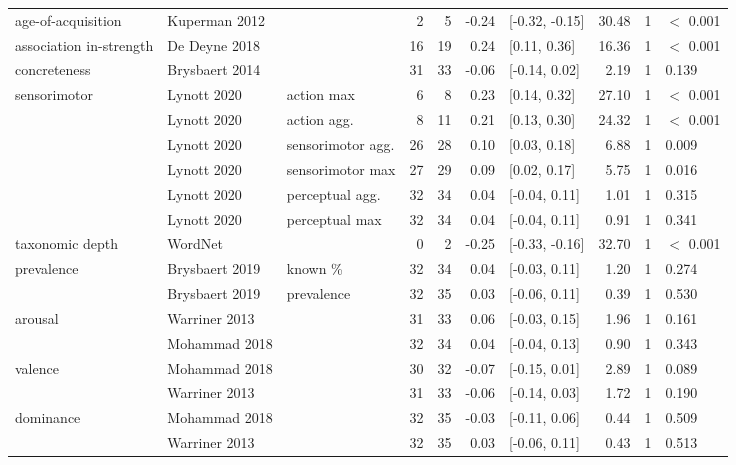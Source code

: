 \begin{table}[ht]
\begin{tabular}{lllrrrlrrl}
  age-of-acquisition & Kuperman 2012 &  & 2 & 5 & -0.24 & [-0.32, -0.15] & 30.48 & 1 & $<$ 0.001 \\ 
  association in-strength & De Deyne 2018 &  & 16 & 19 & 0.24 & [0.11, 0.36] & 16.36 & 1 & $<$ 0.001 \\ 
  concreteness & Brysbaert 2014 &  & 31 & 33 & -0.06 & [-0.14, 0.02] & 2.19 & 1 & 0.139 \\ 
  sensorimotor & Lynott 2020 & action max & 6 & 8 & 0.23 & [0.14, 0.32] & 27.10 & 1 & $<$ 0.001 \\ 
   & Lynott 2020 & action agg. & 8 & 11 & 0.21 & [0.13, 0.30] & 24.32 & 1 & $<$ 0.001 \\ 
   & Lynott 2020 & sensorimotor agg. & 26 & 28 & 0.10 & [0.03, 0.18] & 6.88 & 1 & 0.009 \\ 
   & Lynott 2020 & sensorimotor max & 27 & 29 & 0.09 & [0.02, 0.17] & 5.75 & 1 & 0.016 \\ 
   & Lynott 2020 & perceptual agg. & 32 & 34 & 0.04 & [-0.04, 0.11] & 1.01 & 1 & 0.315 \\ 
   & Lynott 2020 & perceptual max & 32 & 34 & 0.04 & [-0.04, 0.11] & 0.91 & 1 & 0.341 \\ 
  taxonomic depth & WordNet &  & 0 & 2 & -0.25 & [-0.33, -0.16] & 32.70 & 1 & $<$ 0.001 \\ 
  prevalence & Brysbaert 2019 & known \% & 32 & 34 & 0.04 & [-0.03, 0.11] & 1.20 & 1 & 0.274 \\ 
   & Brysbaert 2019 & prevalence & 32 & 35 & 0.03 & [-0.06, 0.11] & 0.39 & 1 & 0.530 \\ 
  arousal & Warriner 2013 &  & 31 & 33 & 0.06 & [-0.03, 0.15] & 1.96 & 1 & 0.161 \\ 
   & Mohammad 2018 &  & 32 & 34 & 0.04 & [-0.04, 0.13] & 0.90 & 1 & 0.343 \\ 
  valence & Mohammad 2018 &  & 30 & 32 & -0.07 & [-0.15, 0.01] & 2.89 & 1 & 0.089 \\ 
   & Warriner 2013 &  & 31 & 33 & -0.06 & [-0.14, 0.03] & 1.72 & 1 & 0.190 \\ 
  dominance & Mohammad 2018 &  & 32 & 35 & -0.03 & [-0.11, 0.06] & 0.44 & 1 & 0.509 \\ 
   & Warriner 2013 &  & 32 & 35 & 0.03 & [-0.06, 0.11] & 0.43 & 1 & 0.513 \\ 
   \hline
\end{tabular}
\end{table}
